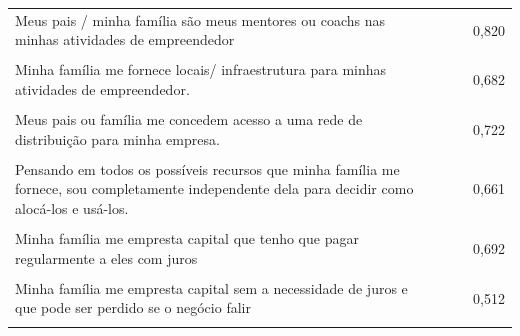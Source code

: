 \begin{center}
\begin{longtable}{p{6cm} c c c }
Meus pais / minha família são meus mentores ou coachs nas minhas atividades de empreendedor
 &  & & 0,820 \\\\
 
Minha família me fornece locais/ infraestrutura para minhas atividades de empreendedor.
 &  & & 0,682 \\\\
 
Meus pais ou família me concedem acesso a uma rede de distribuição para minha empresa.
 &  & & 0,722 \\\\
 
 Pensando em todos os possíveis recursos que minha família me fornece, sou completamente independente dela para decidir como alocá-los e usá-los.
 &  & & 0,661 \\\\
 
Minha família me empresta capital que  tenho que pagar regularmente a eles com juros		
 &  & & 0,692 \\\\
 
Minha família me empresta capital sem a necessidade de juros e que pode ser perdido se o negócio falir
 & & & 0,512 \\\\ \hline 
 
\end{longtable}
\end{center}




